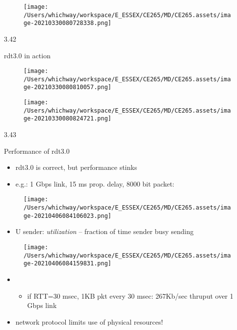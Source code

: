\documentclass[
]{article}
\begin{document}
\begin{figure}
\centering
\texttt{[image: /Users/whichway/workspace/E\_ESSEX/CE265/MD/CE265.assets/image-20210330080728338.png]}
\caption{}
\end{figure}

3.42

rdt3.0 in action

\begin{figure}
\centering
\texttt{[image: /Users/whichway/workspace/E\_ESSEX/CE265/MD/CE265.assets/image-20210330080810057.png]}
\caption{}
\end{figure}

\begin{figure}
\centering
\texttt{[image: /Users/whichway/workspace/E\_ESSEX/CE265/MD/CE265.assets/image-20210330080824721.png]}
\caption{}
\end{figure}

3.43

Performance of rdt3.0

\begin{itemize}
\item
  rdt3.0 is correct, but performance stinks
\item
  e.g.: 1 Gbps link, 15 ms prop. delay, 8000 bit packet:
\end{itemize}

\begin{figure}
\centering
\texttt{[image: /Users/whichway/workspace/E\_ESSEX/CE265/MD/CE265.assets/image-20210406084106023.png]}
\caption{}
\end{figure}

\begin{itemize}
\item
  U sender: \emph{utilization} -- fraction of time sender busy sending
\end{itemize}

\begin{figure}
\centering
\texttt{[image: /Users/whichway/workspace/E\_ESSEX/CE265/MD/CE265.assets/image-20210406084159831.png]}
\caption{}
\end{figure}

\begin{itemize}
\item
  \begin{itemize}
  \item
    if RTT=30 msec, 1KB pkt every 30 msec: 267Kb/sec thruput over 1 Gbps
    link
  \end{itemize}
\item
  network protocol limits use of physical resources!
\end{itemize}
\end{document}
